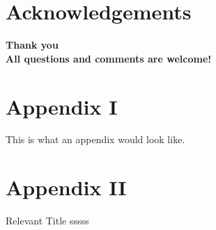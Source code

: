 \section{Acknowledgements}
\begin{frame}
    \centering \wedn \Huge \textbf{Thank you \\ All questions and comments are welcome!}
\end{frame}

\appendix

\section{Appendix I}


\begin{frame}
    
    This is what an appendix would look like.
    
   
\end{frame}

\section{Appendix II} \label{app2}
\begin{frame}
    \begin{block}{Relevant Title}
    sssss
    \end{block}
    
\end{frame}